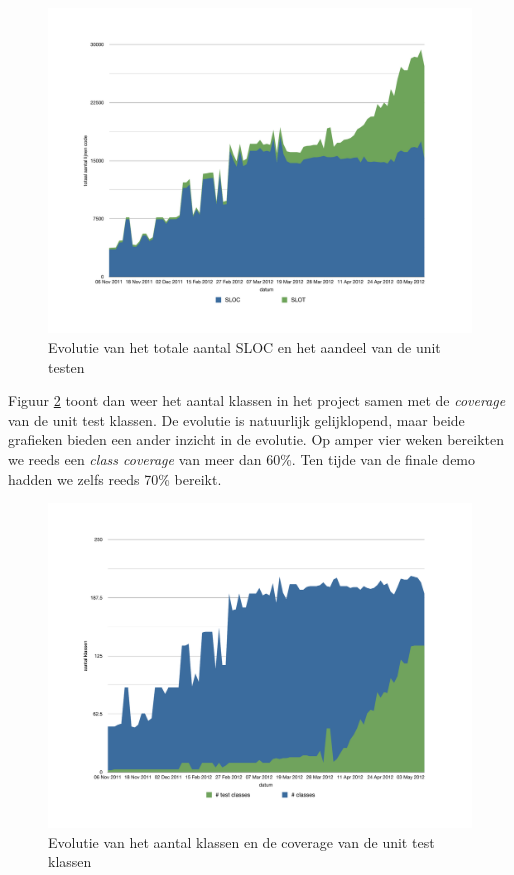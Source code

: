 \documentclass[12pt,a4paper]{report}
\begin{document}
\begin{figure}[htbp]
  \centering
  \includegraphics[width=115mm]{resources/sloc.pdf}
  \caption{Evolutie van het totale aantal SLOC en het aandeel van de unit testen}
  \label{fig:sloc}
\end{figure}

Figuur \ref{fig:coverage} toont dan weer het aantal klassen in het project samen met de \emph{coverage} van de unit test klassen. De evolutie is natuurlijk gelijklopend, maar beide grafieken bieden een ander inzicht in de evolutie. Op amper vier weken bereikten we reeds een \emph{class coverage} van meer dan 60\%. Ten tijde van de finale demo hadden we zelfs reeds 70\% bereikt.

\begin{figure}[htbp]
  \centering
  \includegraphics[width=115mm]{resources/coverage.pdf}
  \caption{Evolutie van het aantal klassen en de coverage van de unit test klassen}
  \label{fig:coverage}
\end{figure}
\end{document}
